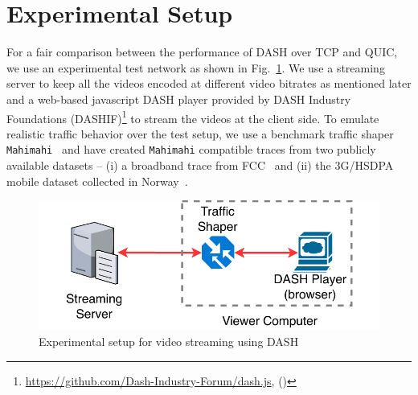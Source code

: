 \section{Experimental Setup}
\label{sec:experimentalSetup}
For a fair comparison between the performance of DASH over TCP and QUIC, 
we use an experimental test network as shown in Fig.~\ref{fig:expeirmental_setup}. We use a streaming server to keep all the videos encoded at different video bitrates as mentioned later and a web-based javascript DASH player provided by DASH Industry Foundations (DASHIF)\footnote{\url{https://github.com/Dash-Industry-Forum/dash.js}, (\lastaccessedtoday)} to stream the videos at the client side. To emulate realistic traffic behavior over the test setup, we use a benchmark traffic shaper {\tt Mahimahi}~\cite{mahimahi} and have created {\tt Mahimahi} compatible traces from two publicly available datasets -- (i) a broadband trace from FCC~\cite{dataset-fcc} and (ii) the 3G/HSDPA mobile dataset collected in Norway~\cite{dataset-norway}.

\begin{figure}[h]
	\centering
	\includegraphics[width=0.8\linewidth]{img/experimental_setup}
	\caption{\label{fig:expeirmental_setup}Experimental setup for video streaming using DASH}
\end{figure}


